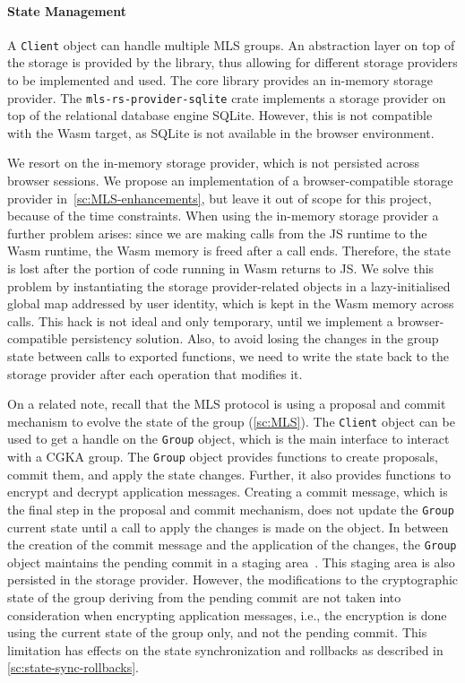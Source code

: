 \paragraph{State Management}
A \texttt{Client} object can handle multiple MLS groups.
An abstraction layer on top of the storage is provided by the library,
thus allowing for different storage providers to be implemented and used.
The core library provides an in-memory storage provider.
The \texttt{mls-rs-provider-sqlite} crate implements a storage provider
on top of the relational database engine SQLite. However, this is not compatible
with the Wasm target, as SQLite is not available in the browser environment.

We resort on the in-memory storage provider, which is not persisted
across browser sessions. We propose an implementation of a browser-compatible
storage provider in~\cref{sc:MLS-enhancements}, but leave it out of scope
for this project, because of the time constraints.
When using the in-memory storage provider a further problem arises:
since we are making calls from the JS runtime to the Wasm runtime,
the Wasm memory is freed after a call ends.
Therefore, the state is lost after the portion of code running in Wasm
returns to JS.
We solve this problem by instantiating the storage provider-related objects
in a lazy-initialised global map addressed by user identity, which is kept in
the Wasm memory across calls. This hack is not ideal and only temporary,
until we implement a browser-compatible persistency solution.
Also, to avoid losing the changes in the group state between calls to
exported functions, we need to write the state back to the storage provider
after each operation that modifies it.

On a related note, recall that the MLS protocol is using a proposal
and commit mechanism to evolve the state of the group (\cref{sc:MLS}).
The \texttt{Client} object can be used to get a handle on the \texttt{Group}
object, which is the main interface to interact with a CGKA group.
The \texttt{Group} object provides functions to create proposals,
commit them, and apply the state changes. Further, it also provides
functions to encrypt and decrypt application messages.
Creating a commit message, which is the final step
in the proposal and commit mechanism, does not update the \texttt{Group}
current state until a call to apply the changes is made on the object.
In between the creation of the commit message and the
application of the changes, the \texttt{Group} object maintains
the pending commit in a staging area~\cite{AWSMLSGroup}.
This staging area is also persisted in the storage provider.
However, the modifications to the cryptographic state of the group
deriving from the pending commit are not taken into consideration
when encrypting application messages, i.e., the encryption
is done using the current state of the group only, and not the pending commit.
This limitation has effects on the state synchronization and rollbacks
as described in \cref{sc:state-sync-rollbacks}.


